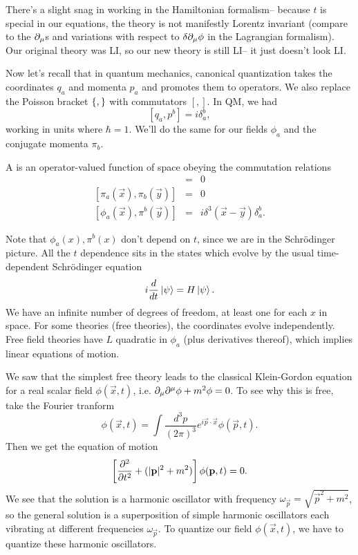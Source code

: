 There's a slight snag in working in the Hamiltonian formalism-- because $t$ is special in our equations, the theory is not manifestly Lorentz invariant (compare to the $\p_\mu$s and variations with respect to $\delta \p_\mu \phi$ in the Lagrangian formalism). Our original theory was LI, so our new theory is still LI-- it just doesn't look LI.

Now let's recall that in quantum mechanics, canonical quantization takes the coordinates $q_a$ and momenta $p_a$ and promotes them to operators. We also replace the Poisson bracket $\set{,}$ with commutators $[,]$. In QM, we had
$$[q_a,p^b]= i \delta_a^b,$$
working in units where $\hbar=1$. We'll do the same for our fields $\phi_a$ and the conjugate momenta $\pi_b$.

\begin{defn}
A  is an operator-valued function of space obeying the commutation relations
\begin{eqnarray}
[\phi_a(\vec{x}),\phi_b(\vec{y})]&=&0 \\
{[\pi_a(\vec{x}),\pi_b (\vec{y})]} &=&0\\
{[\phi_a(\vec{x}),\pi^b (\vec{y})]}&=&i \delta^3(\vec{x}-\vec{y}) \delta_a^b.
\end{eqnarray}
\end{defn}

Note that $\phi_a(x), \pi^b(x)$ don't depend on $t$, since we are in the Schr\"odinger picture. All the $t$ dependence sits in the states which evolve by the usual time-dependent Schr\"odinger equation
$$i\frac{d}{dt} \ket{\psi}=H\ket{\psi}.$$
We have an infinite number of degrees of freedom, at least one for each $x$ in space. For some theories (free theories), the coordinates evolve independently. Free field theories have $L$ quadratic in $\phi_a$ (plus derivatives thereof), which implies linear equations of motion.

We saw that the simplest free theory leads to the classical Klein-Gordon equation for a real scalar field $\phi(\vec{x},t)$, i.e. $\p_\mu \p^\mu \phi+m^2\phi=0$. To see why this is free, take the Fourier tranform
$$\phi(\vec{x},t)=\int \frac{d^3 p}{(2\pi)^3} e^{i \vec{p}\cdot \vec{x}}\phi (\vec{p},t).$$
Then we get the equation of motion
$$\left[\P[2]{}{t}+(|\vec{p}|^2+m^2)\right] \phi(\vec{p},t)=0.$$
We see that the solution is a harmonic oscillator with frequency $\omega_{\vec p} = \sqrt{\vec{p}^2 +m^2}$, so the general solution is a superposition of simple harmonic oscillators each vibrating at different frequencies $\omega_{\vec{p}}$. To quantize our field $\phi(\vec{x},t)$, we have to quantize these harmonic oscillators.

